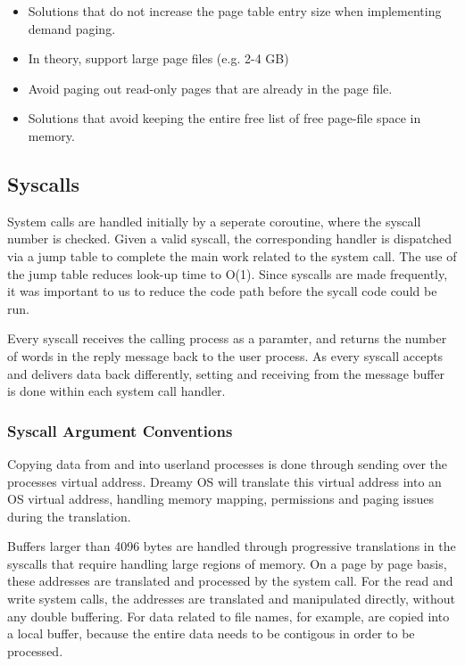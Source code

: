 \documentclass[runningheads,a4paper]{llncs}
\newcommand{\xmark}{\ding{55}}%
\begin{document}
\begin{itemize}[label={\checkmark}]
  \item Solutions that do not increase the page table entry size when implementing demand paging.
  \item In theory, support large page files (e.g. 2-4 GB)
\end{itemize}

\begin{itemize}[label={\xmark}]
  \item Avoid paging out read-only pages that are already in the page file.
  \item Solutions that avoid keeping the entire free list of free page-file space in memory.
\end{itemize}

\medskip
\medskip

\subsection{Syscalls}

System calls are handled initially by a seperate coroutine, where the syscall number is checked. Given a valid syscall, the corresponding handler is dispatched via a jump table to complete the main work related to the system call. The use of the jump table reduces look-up time to O(1). Since syscalls are made frequently, it was important to us to reduce the code path before the sycall code could be run.

Every syscall receives the calling process as a paramter, and returns the number of words in the reply message back to the user process. As every syscall accepts and delivers data back differently, setting and receiving from the message buffer is done within each system call handler.

\subsubsection{Syscall Argument Conventions}

Copying data from and into userland processes is done through sending over the processes virtual address. Dreamy OS will translate this virtual address into an OS virtual address, handling memory mapping, permissions and paging issues during the translation.

Buffers larger than 4096 bytes are handled through progressive translations in the syscalls that require handling large regions of memory. On a page by page basis, these addresses are translated and processed by the system call. For the read and write system calls, the addresses are translated and manipulated directly, without any double buffering. For data related to file names, for example, are copied into a local buffer, because the entire data needs to be contigous in order to be processed.
\end{document}
